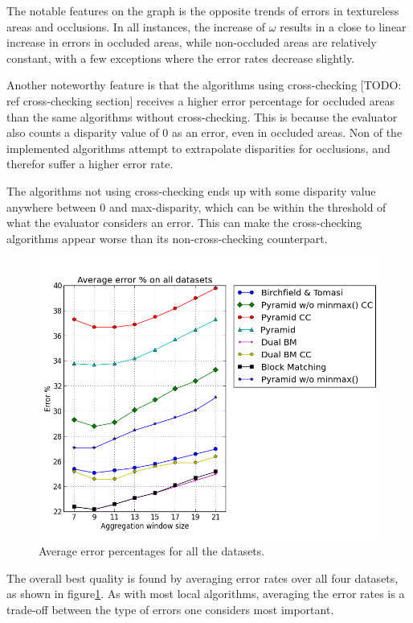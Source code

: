 The notable features on the graph is the opposite trends of errors in
textureless areas and occlusions. In all instances, the increase of
$\omega$ results in a close to linear increase in errors in
occluded areas, while non-occluded areas are relatively constant, with
a few exceptions where the error rates decrease slightly.

Another noteworthy feature is that the algorithms using cross-checking
[TODO: ref cross-checking section] receives a higher error percentage
for occluded areas than the same algorithms without cross-checking.
This is because the evaluator also counts a disparity value of 0 as an
error, even in occluded areas. Non of the implemented algorithms
attempt to extrapolate disparities for occlusions, and therefor suffer
a higher error rate.

The algorithms not using cross-checking ends up with some disparity
value anywhere between 0 and max-disparity, which can be within the
threshold of what the evaluator considers an error. This can make the
cross-checking algorithms appear worse than its non-cross-checking
counterpart.

\begin{figure}
  \centering
  \includegraphics[width=\textwidth]{images/avg_error_all.png}
  \caption{Average error percentages for all the datasets. }
  \label{average-error-rates-final}
\end{figure}

The overall best quality is found by averaging error rates over all
four datasets, as shown in figure\ref{average-error-rates-final}. As
with most local algorithms, averaging the error rates is a trade-off
between the type of errors one considers most important.



